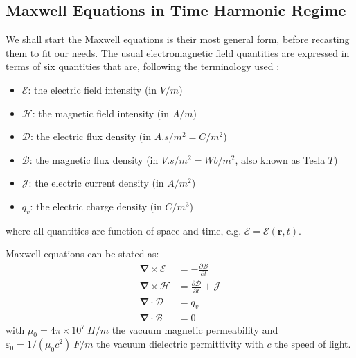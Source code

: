 \subsection{Maxwell Equations in Time Harmonic Regime}
We shall start the Maxwell equations is their most general form, before recasting them to fit our needs. The usual electromagnetic field quantities are expressed in terms of six quantities that are, following the terminology used :
\begin{itemize}
	\item $\boldsymbol{\mathcal{E}}$: the electric field intensity (in $\si{V/m}$)
	\item $\boldsymbol{\mathcal{H}}$: the magnetic field intensity (in $\si{A/m}$)
	\item $\boldsymbol{\mathcal{D}}$: the electric flux density (in $\si{A.s/m^2=C/m^2}$)
	\item $\boldsymbol{\mathcal{B}}$: the magnetic flux density (in $\si{V.s/m^2=Wb/m^2}$, also known as Tesla $\si{T}$)
	\item $\boldsymbol{\mathcal{J}}$: the electric current density (in $\si{A/m^2}$)
	\item $q_v$: the electric charge density (in $\si{C/m^3}$)
\end{itemize}
where all quantities are function of space and time, e.g. $\boldsymbol{\mathcal{E}}=\boldsymbol{\mathcal{E}}(\mathbf{r},t)$. 

Maxwell equations can be stated as:
\begin{subequations}
	\begin{align}
		\boldsymbol{\nabla} \times \boldsymbol{\mathcal{E}} &= -\frac{\partial \boldsymbol{\mathcal{B}}}{\partial t} \label{eq:Maxwell-Faraday}\\
		\boldsymbol{\nabla} \times \boldsymbol{\mathcal{H}} &= \frac{\partial \boldsymbol{\mathcal{D}}}{\partial t} + \boldsymbol{\mathcal{J}} \label{eq:Maxwell-Ampere} \\
		\boldsymbol{\nabla} \cdot \boldsymbol{\mathcal{D}} &= q_v \label{eq:Maxwell-Gauss} \\
		\boldsymbol{\nabla} \cdot \boldsymbol{\mathcal{B}} &= 0 \label{eq:Maxwell-Gauss-Magnetism}
	\end{align}
	\label{eq:MaxwellEquations}
\end{subequations} 
with $\mu_0=4\pi\times10^7~\si{H/m}$ the vacuum magnetic permeability and $\varepsilon_0=1/(\mu_0 c^2)~\si{F/m}$ the vacuum dielectric permittivity with $c$ the speed of light.

